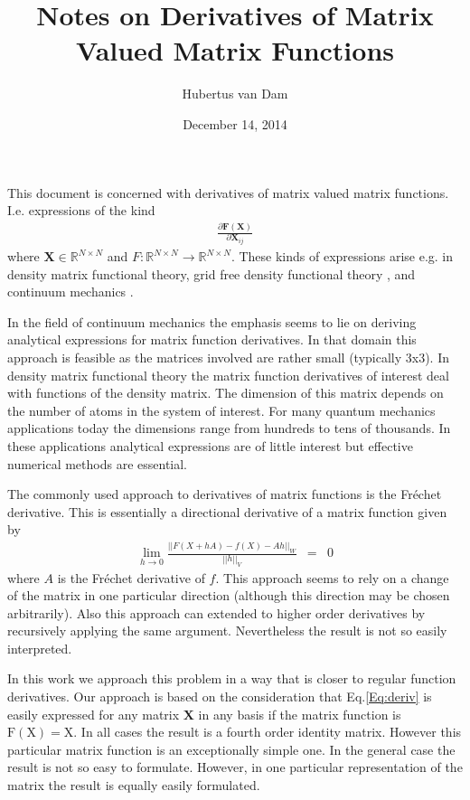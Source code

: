 \documentclass{article}
\title{Notes on Derivatives of Matrix Valued Matrix Functions}
\author{Hubertus van Dam}
\date{December 14, 2014}
\begin{document}
\maketitle

This document is concerned with derivatives of matrix valued matrix functions.
I.e. expressions of the kind
\begin{eqnarray}
\frac{\partial \mathbf{F}(\mathbf{X})}{\partial \mathbf{X}_{ij}}
\label{Eq:deriv}
\end{eqnarray}
where \(\mathbf{X}\in \mathbb{R}^{N\times N}\) and 
\(F: \mathbb{R}^{N\times N}\rightarrow \mathbb{R}^{N\times N}\).
These kinds of expressions arise e.g. in density matrix functional theory,
grid free density functional theory \cite{berghold98}, and continuum mechanics
\cite{jog06,padovani00,hoger84,gurtin83}.

In the field of continuum mechanics the emphasis seems to lie on deriving 
analytical expressions for matrix function derivatives. In that domain this 
approach is feasible as the matrices involved are rather small (typically 
3x3). In density matrix functional theory the matrix function derivatives of
interest deal with functions of the density matrix. The dimension of this 
matrix depends on the number of atoms in the system of interest. For many 
quantum mechanics applications today the dimensions range from hundreds to 
tens of thousands. In these applications analytical expressions are of little
interest but effective numerical methods are essential.

The commonly used approach to derivatives of matrix functions is the Fr\'{e}chet
derivative. This is essentially a directional derivative of a matrix function
given by
\begin{eqnarray}
   \lim_{h\rightarrow 0}\frac{||F(X+hA) - f(X) - Ah||_W}{||h||_V} &=& 0
\end{eqnarray}
where $A$ is the Fr\'{e}chet derivative of $f$. This approach seems to rely
on a change of the matrix in one particular direction (although this direction
may be chosen arbitrarily). Also this approach can extended to higher order
derivatives by recursively applying the same argument. Nevertheless the result
is not so easily interpreted. 

In this work we approach this problem in a way that is closer to regular
function derivatives. Our approach is based on the consideration that
Eq.\ref{Eq:deriv} is easily expressed for any matrix $\mathbf{X}$ in any basis
if the matrix function is  $\mathrm{F}(\mathrm{X}) = \mathrm{X}$.
In all cases the result is a fourth order identity matrix. 
However this particular matrix function is an exceptionally simple 
one. In the general case the result is not so easy to formulate.
However, in one particular representation of the matrix the result is equally
easily formulated. 
\end{document}
